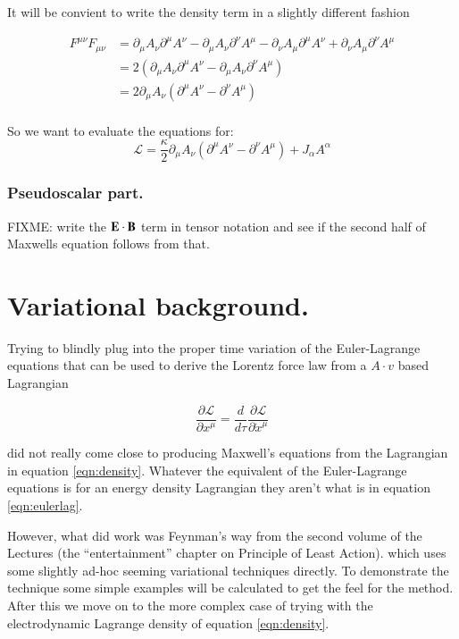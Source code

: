 \documentclass{article}
\newcommand{\LL}[0]{\mathcal{L}}
\newcommand{\PD}[2]{\frac{\partial {#2}}{\partial {#1}}}
\begin{document}
It will be convient to write the density term in a slightly different fashion

\begin{align*}
F^{\mu\nu} F_{\mu\nu}
&=
\partial_{\mu} A_{\nu} \partial^{\mu} A^{\nu}
-\partial_{\mu} A_{\nu} \partial^{\nu} A^{\mu}
-\partial_{\nu} A_{\mu} \partial^{\mu} A^{\nu}
+\partial_{\nu} A_{\mu} \partial^{\nu} A^{\mu} \\
&= 2 \left( \partial_{\mu} A_{\nu} \partial^{\mu} A^{\nu} -\partial_{\mu} A_{\nu} \partial^{\nu} A^{\mu} \right) \\
&= 2 \partial_{\mu} A_{\nu} \left( \partial^{\mu} A^{\nu} -\partial^{\nu} A^{\mu} \right) \\
\end{align*}

So we want to evaluate the equations for:
\begin{equation}\label{eqn:density}
\LL = \frac{\kappa}{2} \partial_{\mu} A_{\nu} ( \partial^{\mu} A^{\nu} - \partial^{\nu} A^{\mu} ) + J_{\alpha} A^{\alpha}
\end{equation}

\subsubsection{ Pseudoscalar part. }

FIXME: write the $\mathbf{E} \cdot \mathbf{B}$ term in tensor notation and see if the second half of Maxwells equation follows from that.

\section{ Variational background. }

Trying to blindly plug into the proper time variation of the Euler-Lagrange equations that can be used to derive the Lorentz force law from a $A \cdot v$ based Lagrangian

\begin{equation}\label{eqn:eulerlag}
\PD{x^\mu}{\LL} = \frac{d}{d\tau} \PD{\dot{x}^\mu}{\LL}
\end{equation}

did not really come close to producing Maxwell's equations from the Lagrangian in equation \ref{eqn:density}.  Whatever the equivalent of the Euler-Lagrange equations is for an energy density Lagrangian they aren't what is in equation \ref{eqn:eulerlag}.

However, what did work was Feynman's way from the second volume of the Lectures (the ``entertainment'' chapter on Principle of Least Action).
which uses some slightly ad-hoc seeming variational techniques directly.  To demonstrate the technique some simple examples
will be calculated to get the feel for the method.  After this we move on to the more complex case of trying with the electrodynamic Lagrange
density of equation \ref{eqn:density}.
\end{document}
